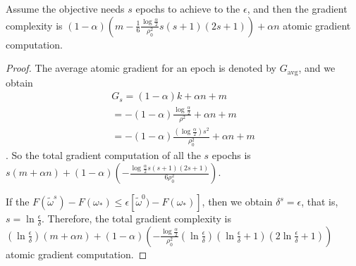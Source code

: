 \documentclass[letterpaper]{article}
\begin{document}
\begin{Theorem}
\label{theorem_gradient_complexity}
Assume the objective needs $s$ epochs to achieve to the $\epsilon$, and then the gradient complexity is $(1-\alpha)\left( m-\frac{1}{6} \frac{\log\frac{\alpha}{2}}{\rho_0^2} s(s+1)(2s+1) \right) + \alpha n$ atomic gradient computation.
\end{Theorem}
\begin{proof}
The average atomic gradient for an epoch is denoted by $G_\mathrm{avg}$, and we obtain
\begin{equation}
\label{equa_gradient_complexity_1}
\begin{array}{ll}
G_s = (1-\alpha) k + \alpha n +m \\
= -(1-\alpha) \frac{\log\frac{\alpha}{2}}{\rho^2} + \alpha n +m \\
=- (1-\alpha)  \frac{\left(\log\frac{\alpha}{2}\right)s^2}{\rho_0^2} +\alpha n +m
\end{array}
\end{equation}. So the total gradient computation of all the $s$ epochs is $s(m+\alpha n)+(1-\alpha)\left( - \frac{\log\frac{\alpha}{2}s(s+1)(2s+1)}{6\rho_0^2} \right) $.

If the $F(\tilde{\omega}^s)-F(\omega_\ast) \le \epsilon [\tilde{\omega}^0)-F(\omega_\ast)]$, then we obtain $\delta^s = \epsilon$, that is, $s=\ln \frac{\epsilon}{\delta}$. Therefore, the total  gradient complexity is 
$(\ln \frac{\epsilon}{\delta})(m+\alpha n)+(1-\alpha)\left( - \frac{\log\frac{\alpha}{2}}{\rho_0^2} (\ln \frac{\epsilon}{\delta})(\ln \frac{\epsilon}{\delta}+1)(2\ln \frac{\epsilon}{\delta}+1)\right) $ atomic gradient computation. 
\end{proof}
\end{document}
